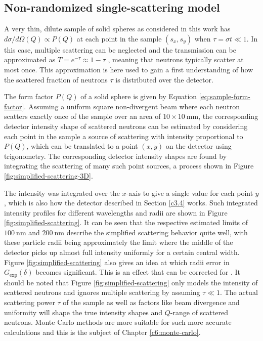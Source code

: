 \subsection{Non-randomized single-scattering model}
A very thin, dilute sample of solid spheres as considered in this work has $d\sigma/d\Omega(Q) \propto P(Q)$ at each point in the sample $(s_x, s_y)$ when $\tau = \sigma t\ll 1$. In this case, multiple scattering can be neglected and the transmission can be approximated as $T = e^{-\tau} \approx 1 - \tau$  \cite{rekveldt2003}, meaning that neutrons typically scatter at most once. This approximation is here used to gain a first understanding of how the scattered fraction of neutrons $\tau$ is distributed over the detector.

The form factor $P(Q)$ of a solid sphere is given by Equation \eqref{eq:sample-form-factor}. Assuming a uniform square non-divergent beam where each neutron scatters exactly once of the sample over an area of $10\times10~\unit{\milli\meter}$, the corresponding detector intensity shape of scattered neutrons can be estimated by considering each point in the sample a source of scattering with intensity proportional to $P(Q)$, which can be translated to a point $(x,y)$ on the detector using trigonometry. The corresponding detector intensity shapes are found by integrating the scattering of many such point sources, a process shown in Figure \ref{fig:simplified-scattering-3D}.

The intensity was integrated over the $x$-axis to give a single value for each point $y$, which is also how the detector described in Section \ref{c3.4} works. Such integrated intensity profiles for different wavelengths and radii are shown in Figure \ref{fig:simplified-scattering}. It can be seen that the respective estimated limits of $\SI{100}{\nano\meter}$ and $\SI{200}{\nano\meter}$ describe the simplified scattering behavior quite well, with these particle radii being approximately the limit where the middle of the detector picks up almost full intensity uniformly for a certain central width. Figure \ref{fig:simplified-scattering} also gives an idea at which radii error in $G_\text{exp}(\delta)$ becomes significant. This is an effect that can be corrected for \cite{kusmin2017}. It should be noted that Figure \ref{fig:simplified-scattering} only models the intensity of scattered neutrons and ignores multiple scattering by assuming $\tau \ll 1$. The actual scattering power $\tau$ of the sample as well as factors like beam divergence and uniformity will shape the true intensity shapes and $Q$-range of scattered neutrons.  Monte Carlo methods are more suitable for such more accurate calculations and this is the subject of Chapter \ref{c6:monte-carlo}.

